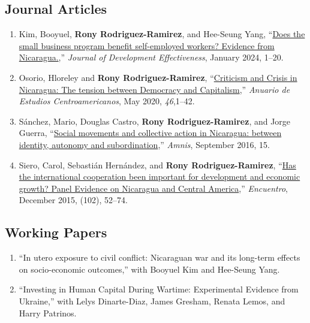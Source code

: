 \documentclass[a4paper,10pt]{article}
\begin{document}
\subsection*{Journal Articles}

\begin{enumerate}[leftmargin=10pt, label={}, itemindent=-10pt, nosep]
\item Kim, Booyuel, \textbf{Rony Rodriguez-Ramirez}, and Hee-Seung Yang, ``\href{https://www.tandfonline.com/doi/full/10.1080/19439342.2023.2300138}{Does the small business
program benefit self-employed workers? Evidence from Nicaragua.},''
\textit{Journal of Development Effectiveness}, January 2024, 1--20. 
\item Osorio, Hloreley and \textbf{Rony Rodriguez-Ramirez},
``\href{https://revistas.ucr.ac.cr/index.php/anuario/article/view/45081/44860}{Criticism
and Crisis in Nicaragua: The tension between Democracy and Capitalism},'' \emph{Anuario de Estudios Centroamericanos}, May 2020, \textit{46},1--42.
\item Sánchez, Mario, Douglas Castro, \textbf{Rony Rodriguez-Ramirez}, and Jorge
Guerra, ``\href{https://amnis.revues.org/2813}{Social movements and collective
action in Nicaragua: between identity, autonomy and subordination},'' \emph{Amnis}, September 2016, 15.

\item Siero, Carol, Sebastián Hernández, and \textbf{Rony Rodriguez-Ramirez},
``\href{http://www.uca.edu.ni/2/images/Revista-Encuentro/Revistas/e102/art-5.pdf}{Has
the international cooperation been important for development and economic
growth? Panel Evidence on Nicaragua and Central America},''
\emph{Encuentro}, December 2015, (102), 52--74.
\end{enumerate}

\subsection*{Working Papers}

\begin{enumerate}[leftmargin=10pt, label={}, itemindent=-10pt, nosep]
\item ``In utero exposure to civil conflict: Nicaraguan war and its long-term
effects on socio-economic outcomes,'' with Booyuel Kim and Hee-Seung Yang.
\item ``Investing in Human Capital During Wartime: Experimental Evidence from Ukraine,'' with Lelys
Dinarte-Diaz, James Gresham, Renata Lemos, and Harry Patrinos. 
\end{enumerate}
\end{document}
